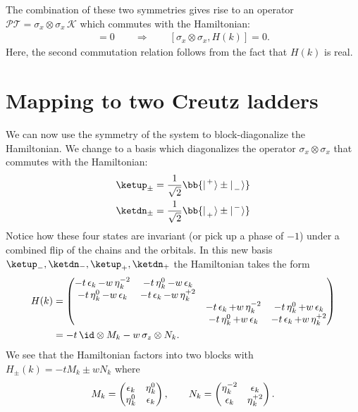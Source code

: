 The combination of these two symmetries gives rise to an operator $\mathcal{P}\mathcal{T} = \sigma_x \otimes \sigma_x \, \mathcal{K}$ which commutes with the Hamiltonian:
\begin{align}
    [\mathcal{P}\mathcal{T}, H(k)] = 0\qquad \Rightarrow \qquad [\sigma_x \otimes \sigma_x, H(k)]= 0.
\end{align}
Here, the second commutation relation follows from the fact that $H(k)$ is real.


\section{Mapping to two Creutz ladders}
We can now use the symmetry of the system to block-diagonalize the Hamiltonian. We change to a basis which diagonalizes the operator $\sigma_x \otimes \sigma_x$ that commutes with the Hamiltonian:
\begin{align}
    \ketup_\pm = \frac{1}{\sqrt{2}} \bb{ \upp \pm \dnm } \\
    \ketdn_\pm = \frac{1}{\sqrt{2}} \bb{ \dnp \pm \upm }
\end{align}
Notice how these four states are invariant (or pick up a phase of $-1$) under a combined flip of the chains and the orbitals.
In this new basis $\ketup_-, \ketdn_-, \ketup_+, \ketdn_+$ the Hamiltonian takes the form
\begin{align}
    H(k) &=
    \begin{pmatrix}
        -t\ep_k -w\et_k^{-2} & -t\et_k^0 -w\ep_k &  &  \\
        -t\et^0_k - w\ep_k & -t \ep_k - w\et_k^{+2} &  &  \\
         &  & -t\ep_k +w\et_k^{-2} & -t\et_k^0 +w\ep_k \\
         &  & -t\et^0_k + w\ep_k & -t \ep_k + w\et_k^{+2}
    \end{pmatrix} \\
    &= - t \, \id \otimes M_k - w \, \sigma_z \otimes N_k.
\end{align}
We see that the Hamiltonian factors into two blocks with $H_\pm(k) = -t M_k \pm w N_k$ where
\begin{align}
    M_k = \begin{pmatrix}
        \operatorname{\epsilon}_k & \operatorname{\eta}_k^0 \\
        \operatorname{\eta}_k^0 & \operatorname{\epsilon}_k
    \end{pmatrix},\qquad
    N_k = \begin{pmatrix}
    \operatorname{\eta}_k^{-2} & \operatorname{\epsilon}_k \\
    \operatorname{\epsilon}_k & \operatorname{\eta}_k^{+2}
    \end{pmatrix}.
\end{align}

